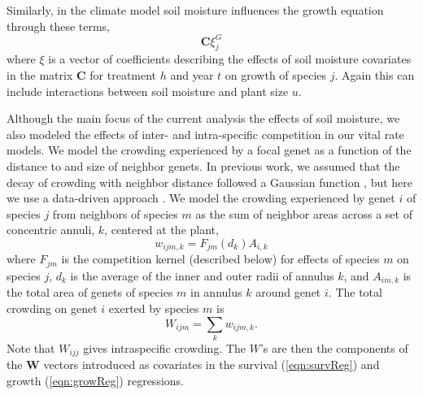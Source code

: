 \documentclass[11pt]{article}
\begin{document}
\begin{doublespacing}
Similarly, in the climate model soil moisture influences the growth equation through these terms,  
\begin{equation}
\boldsymbol{C}\xi_{j}^G 
\label{eqn:growC}
\end{equation}
where $\xi$ is a vector of coefficients describing the effects of soil moisture covariates in the matrix $\boldsymbol{C}$ for treatment $h$ and year $t$ on growth of species $j$. Again this can include interactions between soil moisture and plant size $u$.

Although the main focus of the current analysis the effects of soil moisture, we also modeled the effects of inter- and intra-specific competition in our vital rate models.  We model the crowding experienced by a focal genet as a function of the distance to and size of neighbor genets. In previous work, we assumed that the decay of crowding with neighbor distance followed a Gaussian function \citep{chu_large_2015}, but here we use a data-driven approach \citep{teller_linking_2016, adler_in_prep}. We model the crowding experienced by genet $i$ of species $j$ from neighbors of species $m$ as the sum of neighbor areas across a set of concentric annuli, $k$, centered at the plant,
\begin{equation}
w_{ijm,k} = F_{jm}(d_{k})A_{i,k}     
\label{eqn:wik}
\end{equation}
where $F_{jm}$ is the competition kernel (described below) for effects of species $m$ on species $j$, 
$d_{k}$ is the average of the inner and outer radii of annulus $k$, 
and $A_{im,k}$ is the total area of genets of species $m$ in annulus $k$ around genet $i$. The total crowding on 
genet $i$ exerted by species $m$ is
\begin{equation}
W_{ijm}  =\sum_k {w_{ijm,k}} .
\label{eqn:wijm}
\end{equation} 
Note that $W_{ijj}$ gives intraspecific crowding. The $W$'s are then the components of the $\boldsymbol{W}$ vectors introduced as covariates in the survival (\ref{eqn:survReg}) and growth (\ref{eqn:growReg}) regressions.


\end{doublespacing}
\end{document}
